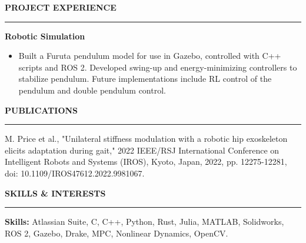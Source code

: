\documentclass[11pt]{article}
\newcommand{\sectionheading}[1]{%
  \vspace{1em}%
  {\large\textbf{\MakeUppercase{#1}}}\\[-0.5em]%
  \rule{\textwidth}{0.5pt}%
  \vspace{0.5em}%
}
\begin{document}
\sectionheading{Project Experience}

\textbf{Robotic Simulation}
\begin{itemize}
\item Built a Furuta pendulum model for use in Gazebo, controlled with C++ scripts and ROS 2. Developed swing-up and energy-minimizing controllers to stabilize pendulum. Future implementations include RL control of the pendulum and double pendulum control.
\end{itemize}

\sectionheading{Publications}

M. Price et al., "Unilateral stiffness modulation with a robotic hip exoskeleton elicits adaptation during gait," 2022 IEEE/RSJ International Conference on Intelligent Robots and Systems (IROS), Kyoto, Japan, 2022, pp. 12275-12281, doi: 10.1109/IROS47612.2022.9981067.

\sectionheading{Skills \& Interests}

\textbf{Skills:} Atlassian Suite, C, C++, Python, Rust, Julia, MATLAB, Solidworks, ROS 2, Gazebo, Drake, MPC, Nonlinear Dynamics, OpenCV.
\end{document}
